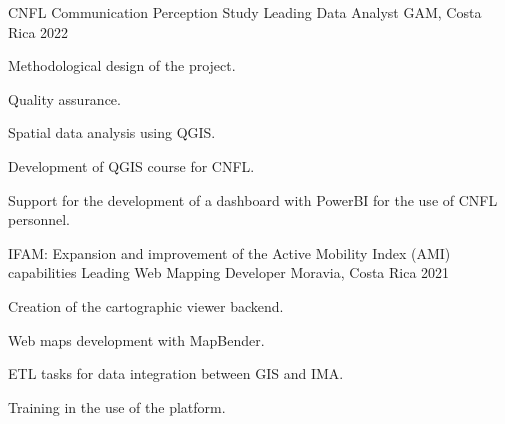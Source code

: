 \begin{cventries}
{  }
\cventry
  {CNFL Communication Perception Study} %
  {Leading Data Analyst} %
  {GAM, Costa Rica} %
  {2022} %
  {
    \begin{cvitems} %
      \item Methodological design of the project.
      \item Quality assurance.
      \item Spatial data analysis using QGIS.
      \item Development of QGIS course for CNFL.
      \item Support for the development of a dashboard with PowerBI for the use of CNFL
      personnel.
    \end{cvitems}
  }
\cventry
  {IFAM: Expansion and improvement of the Active Mobility Index (AMI) capabilities} %
  {Leading Web Mapping Developer} %
  {Moravia, Costa Rica} %
  {2021} %
  {
    \begin{cvitems} %
      \item Creation of the cartographic viewer backend.
      \item Web maps development with MapBender.
      \item ETL tasks for data integration between GIS and IMA.
      \item Training in the use of the platform.
    \end{cvitems}
  }
\end{cventries}